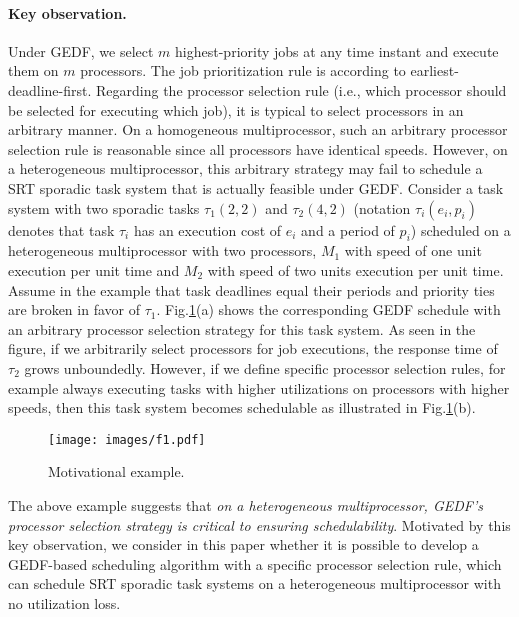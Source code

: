 \documentclass[Times, 10pt,twocolumn]{article}
\theoremstyle{definition}
\begin{document}
\paragraph{Key observation.} Under GEDF, we select $m$ highest-priority jobs at any time instant and execute them on $m$ processors. The job prioritization rule is according to earliest-deadline-first. Regarding the processor selection rule (i.e., which processor should be selected for executing which job), it is typical to select processors in an arbitrary manner. On a homogeneous multiprocessor, such an arbitrary processor selection rule is reasonable since all processors have identical speeds. However, on a heterogeneous multiprocessor, this arbitrary strategy may fail to schedule a SRT sporadic task system that is actually feasible under GEDF. Consider a task system with two sporadic tasks $\tau_1(2,2)$ and $\tau_2(4,2)$ (notation $\tau_i(e_i, p_i)$ denotes that task $\tau_i$ has an execution cost of $e_i$ and a period of $p_i$) scheduled on a heterogeneous multiprocessor with two processors, $M_1$ with speed of one unit execution per unit time and $M_2$ with speed of two units execution per unit time. Assume in the example that task deadlines equal their periods and priority ties are broken in favor of $\tau_1$. Fig.\ref{fig:simpleexample}(a) shows the corresponding GEDF schedule with an  arbitrary processor selection strategy for this task system. As seen in the figure, if we arbitrarily select processors for job executions, the response time of $\tau_2$ grows unboundedly. However, if we define specific processor selection rules, for example always executing tasks with higher utilizations on processors with higher speeds, then this task system becomes schedulable as illustrated in Fig.\ref{fig:simpleexample}(b).

\begin{figure}[t]
	\begin{center}
	\texttt{[image: images/f1.pdf]} 
	\end{center}  
\vspace{-3mm}
\caption{Motivational example.}
\vspace{-3mm}
\label{fig:simpleexample}
\end{figure}



The above example suggests that \textit{on a heterogeneous multiprocessor, GEDF's processor selection strategy is critical to ensuring schedulability}. Motivated by this key observation, we consider in this paper whether it is possible to develop a GEDF-based scheduling algorithm with a specific processor selection rule, which can schedule SRT sporadic task systems on a heterogeneous multiprocessor with no utilization loss.
\end{document}
